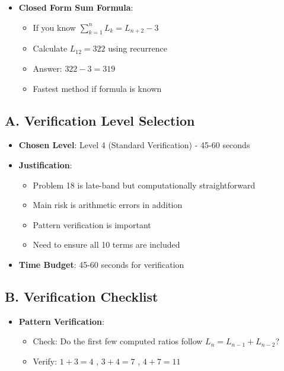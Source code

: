 \documentclass[12pt]{article}
\begin{document}
\begin{techniquesbox}
\begin{itemize}[leftmargin=*]
    \item \textbf{Closed Form Sum Formula}:
    \begin{itemize}
        \item If you know $\sum_{k=1}^{n} L_k = L_{n+2} - 3$
        \item Calculate $L_{12} = 322$ using recurrence
        \item Answer: $322 - 3 = 319$
        \item Fastest method if formula is known
    \end{itemize}
\end{itemize}
\end{techniquesbox}

\begin{verificationbox}
\subsection*{A. Verification Level Selection}
\begin{itemize}[leftmargin=*]
    \item \textbf{Chosen Level}: Level 4 (Standard Verification) - 45-60 seconds
    
    \item \textbf{Justification}: 
    \begin{itemize}
        \item Problem 18 is late-band but computationally straightforward
        \item Main risk is arithmetic errors in addition
        \item Pattern verification is important
        \item Need to ensure all 10 terms are included
    \end{itemize}
    
    \item \textbf{Time Budget}: 45-60 seconds for verification
\end{itemize}

\subsection*{B. Verification Checklist}
\begin{itemize}[leftmargin=*]
    \item \textbf{Pattern Verification}:
    \begin{itemize}
        \item Check: Do the first few computed ratios follow $L_n = L_{n-1} + L_{n-2}$?
        \item Verify: $1 + 3 = 4$ \checkmark, $3 + 4 = 7$ \checkmark, $4 + 7 = 11$ \checkmark
    \end{itemize}
    

\end{itemize}
\end{verificationbox}
\end{document}
